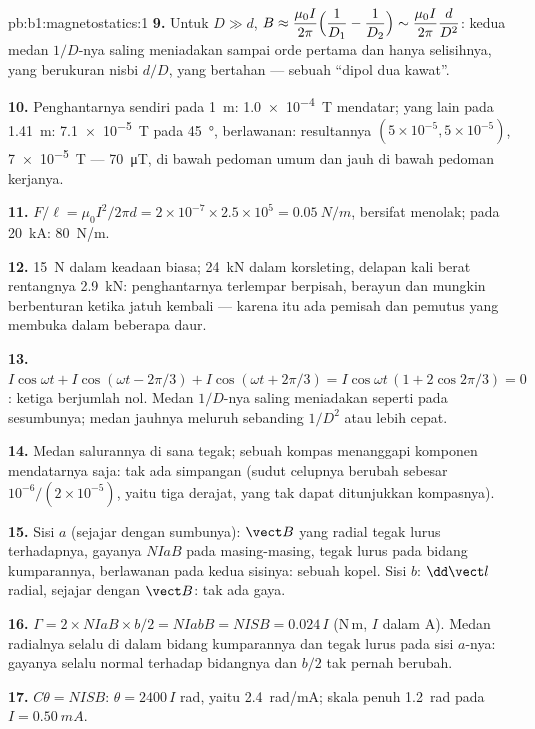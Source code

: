 \begin{solution}{pb:b1:magnetostatics:1}
\textbf{9.} Untuk $D \gg d$, $B \approx \dfrac{\mu_0I}{2\pi}\Bigl(\dfrac1{D_1} - \dfrac1{D_2}\Bigr)
\sim \dfrac{\mu_0I}{2\pi}\dfrac{d}{D^2}$: kedua medan $1/D$-nya saling meniadakan sampai orde
pertama dan hanya selisihnya, yang berukuran nisbi $d/D$, yang bertahan --- sebuah
``dipol dua kawat''.

\textbf{10.} Penghantarnya sendiri pada \qty{1}{m}: \qty{1.0e-4}{T} mendatar; yang lain
pada \qty{1.41}{m}: \qty{7.1e-5}{T} pada \qty{45}{\degree}, berlawanan: resultannya
$(5 \times 10^{-5}, 5 \times 10^{-5})$, \qty{7e-5}{T} --- \qty{70}{\micro T}, di bawah
pedoman umum dan jauh di bawah pedoman kerjanya.

\textbf{11.} $F/\ell = \mu_0I^2/2\pi d = 2 \times 10^{-7} \times 2.5 \times 10^5 =
\qty{0.05}{N/m}$, bersifat menolak; pada \qty{20}{kA}: \qty{80}{N/m}.

\textbf{12.} \qty{15}{N} dalam keadaan biasa; \qty{24}{kN} dalam korsleting, delapan kali
berat rentangnya \qty{2.9}{kN}: penghantarnya terlempar berpisah, berayun
dan mungkin berbenturan ketika jatuh kembali --- karena itu ada pemisah dan pemutus yang
membuka dalam beberapa daur.

\textbf{13.} $I\cos\omega t + I\cos(\omega t - 2\pi/3) + I\cos(\omega t + 2\pi/3) =
I\cos\omega t\,(1 + 2\cos2\pi/3) = 0$: ketiga  berjumlah nol. Medan
$1/D$-nya saling meniadakan seperti pada sesumbunya; medan jauhnya meluruh sebanding $1/D^2$ atau
lebih cepat.

\textbf{14.} Medan salurannya di sana tegak; sebuah kompas menanggapi
komponen mendatarnya saja: tak ada simpangan (sudut celupnya berubah sebesar
$10^{-6}/(2 \times 10^{-5})$, yaitu tiga derajat, yang tak dapat ditunjukkan kompasnya).

\textbf{15.} Sisi $a$ (sejajar dengan sumbunya): $\vect B$ yang radial
tegak lurus terhadapnya, gayanya $NIaB$ pada masing-masing, tegak lurus pada
bidang kumparannya, berlawanan pada kedua sisinya: sebuah kopel. Sisi $b$: $\dd\vect l$
radial, sejajar dengan $\vect B$: tak ada gaya.

\textbf{16.} $\Gamma = 2 \times NIaB \times b/2 = NIabB = NISB = 0.024\,I$ (N\,m, $I$
dalam A). Medan radialnya selalu di dalam bidang kumparannya dan tegak lurus
pada sisi $a$-nya: gayanya selalu normal terhadap bidangnya dan  $b/2$ tak pernah berubah.

\textbf{17.} $C\theta = NISB$: $\theta = 2400\,I$ rad, yaitu \qty{2.4}{rad/mA}; skala
penuh \qty{1.2}{rad} pada $I = \qty{0.50}{mA}$.


\end{solution}
